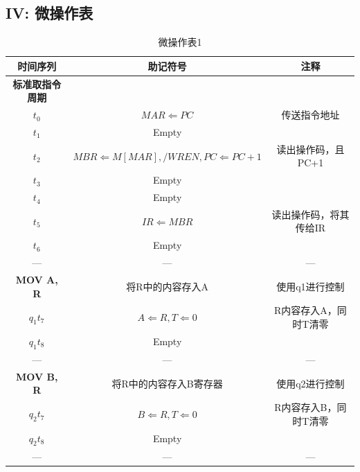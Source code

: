 \documentclass[UTF8]{ctexart}
\begin{document}
    \subsection{IV: 微操作表}
    \begin{table}[!htb]
      \centering
      \begin{tabular}{|c|c|c|}
        \hline
        时间序列 & 助记符号 & 注释\\
        \hline
        \textbf{标准取指令周期 }& &\\
        $t_0$ &  $MAR \Leftarrow PC$ & 传送指令地址 \\
        $t_1$ & Empty &  \\
        $t_2$ & $ MBR \Leftarrow M[MAR], /WREN, PC \Leftarrow PC + 1 $ & 读出操作码，且PC+1\\
        $t_3$ & Empty &  \\
        $t_4$ & Empty &  \\
        $t_5$ & $IR \Leftarrow MBR $ & 读出操作码，将其传给IR \\
        $t_6$ & Empty &  \\
        ---&---&---\\
        \hline
        \textbf{MOV A, R} & 将R中的内容存入A  & 使用q1进行控制\\
        $q_1t_7$ & $ A \Leftarrow R, T \Leftarrow 0 $& R内容存入A，同时T清零 \\
        $q_1t_8$ & Empty &  \\
        ---&---&---\\
        \hline
        \textbf{MOV B, R }& 将R中的内容存入B寄存器  & 使用q2进行控制\\
        $q_2t_7$ & $B \Leftarrow R, T \Leftarrow 0$ & R内容存入B，同时T清零 \\
        $q_2t_8$ & Empty &  \\
        ---&---&---\\
        \hline
      \end{tabular}
      \caption{微操作表1}\label{微操作表1}
    \end{table}
    \newpage
\end{document}
